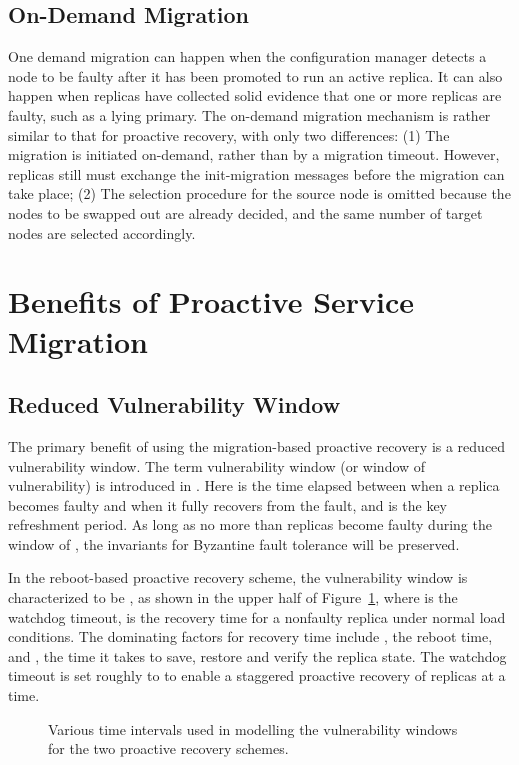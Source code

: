 \documentclass[times, 10pt, twocolumn]{article}
\begin{document}
\subsection{On-Demand Migration} 
\label{ondemandsec}
One demand migration can happen when the configuration manager detects a 
node to be faulty after it has been promoted to run an active replica. 
It can also happen when replicas have collected solid evidence that one or
more replicas are faulty,
such as a lying primary. The on-demand migration mechanism is rather
similar to that for proactive recovery, with only two differences:
(1) The migration is initiated on-demand, rather than by a migration timeout.
However, replicas still must exchange the {\sc init-migration} messages
before the migration can take place; (2) The selection procedure for the
source node is omitted because the nodes to be swapped out are already decided,
and the same number of target nodes are selected accordingly.

\section{Benefits of Proactive Service Migration}
\label{benefitsec}
\subsection{Reduced Vulnerability Window}
The primary benefit of using the migration-based proactive recovery 
is a reduced vulnerability window. The term vulnerability window (or window of 
vulnerability)  is introduced in \cite{bft-acm}. 
Here  is the time elapsed between when a replica becomes faulty and 
when it fully recovers from the fault, and  is the key refreshment 
period. As long as no more than  replicas
become faulty during the window of , the invariants for Byzantine
fault tolerance will be preserved.

In the reboot-based proactive recovery scheme, the vulnerability window
 is characterized to be , as shown in the 
upper half of Figure~\ref{windowfig}, where  is the watchdog timeout,
 is the recovery time for a nonfaulty replica under normal load
conditions. The dominating factors for recovery time include , the
reboot time, and , the time it takes to save, restore and verify
the replica state. The watchdog timeout  is set roughly to
 to enable a staggered proactive recovery of  replicas at a time.

\begin{figure}[t]
\begin{center} 
\leavevmode
\epsfxsize=3.0in
\caption{Various time intervals used in modelling the vulnerability
windows for the two proactive recovery schemes.}
\label{windowfig}
\end{center}
\end{figure}
\end{document}
